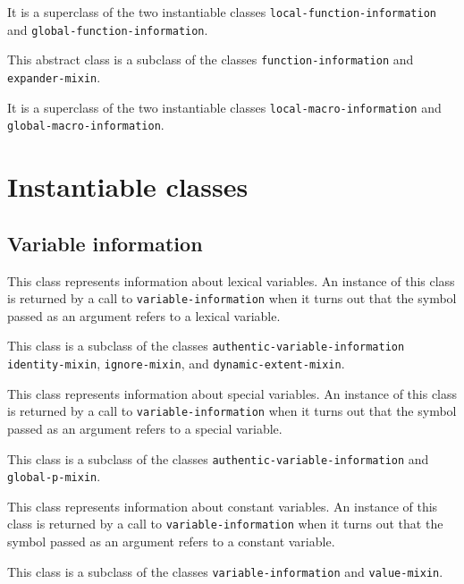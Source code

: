 It is a superclass of the two instantiable classes
\texttt{local-function-information} and
\texttt{global-function-information}.


This abstract class is a subclass of the classes
\texttt{function-information} and \texttt{expander-mixin}.

It is a superclass of the two instantiable classes
\texttt{local-macro-information} and
\texttt{global-macro-information}.

\section{Instantiable classes}

\subsection{Variable information}


This class represents information about lexical variables.  An
instance of this class is returned by a call to \texttt{variable-information}
when it turns out that the symbol passed as an argument refers to a
lexical variable.

This class is a subclass of the classes
\texttt{authentic-variable-information} \texttt{identity-mixin},
\texttt{ignore-mixin}, and \texttt{dynamic-extent-mixin}.


This class represents information about special variables.   An
instance of this class is returned by a call to \texttt{variable-information}
when it turns out that the symbol passed as an argument refers to a
special variable.

This class is a subclass of the classes
\texttt{authentic-variable-information} and \texttt{global-p-mixin}.


This class represents information about constant variables.   An
instance of this class is returned by a call to \texttt{variable-information}
when it turns out that the symbol passed as an argument refers to a
constant variable.

This class is a subclass of the classes \texttt{variable-information} and
\texttt{value-mixin}.



